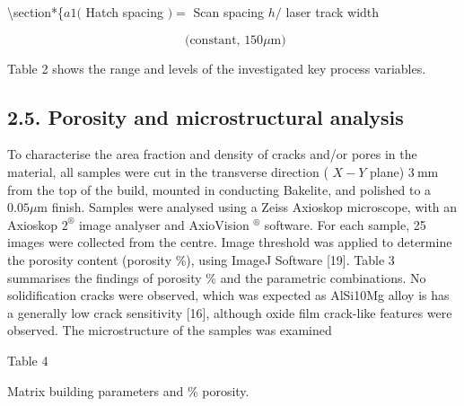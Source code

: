 \documentclass[10pt]{article}
\begin{document}
\textbackslash section*\{$a 1($ Hatch spacing $)=$ Scan spacing $h /$ laser track width

$$
\text { (constant, } 150 \mu \mathrm{m})
$$

Table 2 shows the range and levels of the investigated key process variables.

\subsection*{2.5. Porosity and microstructural analysis}
To characterise the area fraction and density of cracks and/or pores in the material, all samples were cut in the transverse direction ( $X-Y$ plane) $3 \mathrm{~mm}$ from the top of the build, mounted in conducting Bakelite, and polished to a $0.05 \mu \mathrm{m}$ finish. Samples were analysed using a Zeiss Axioskop microscope, with an Axioskop $2^{\circledR}$ image analyser and AxioVision ${ }^{\circledR}$ software. For each sample, 25 images were collected from the centre. Image threshold was applied to determine the porosity content (porosity \%), using ImageJ Software [19]. Table 3 summarises the findings of porosity \% and the parametric combinations. No solidification cracks were observed, which was expected as AlSi10Mg alloy is has a generally low crack sensitivity [16], although oxide film crack-like features were observed. The microstructure of the samples was examined

Table 4

Matrix building parameters and \% porosity.
\end{document}
